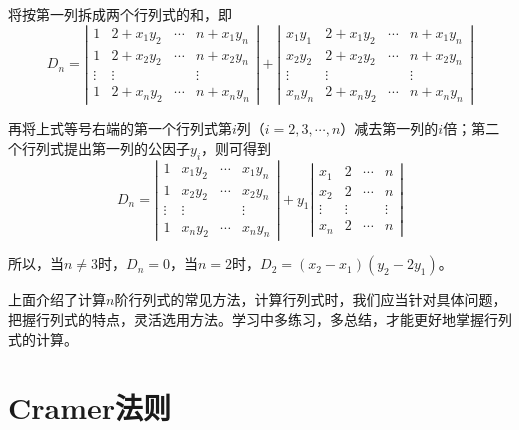 \begin{solution}
    将按第一列拆成两个行列式的和，即
$$D_{n}=\left|\begin{array}{ccccccc}
        1      & 2+x_{1}y_{2} & \cdots & n+x_{1}y_{n} \\
        1      & 2+x_{2}y_{2} & \cdots & n+x_{2}y_{n} \\
        \vdots & \vdots       &        & \vdots       \\
        1      & 2+x_{n}y_{2} & \cdots & n+x_{n}y_{n}
    \end{array}\right|+
    \left|\begin{array}{ccccccc}
        x_{1}y_{1} & 2+x_{1}y_{2} & \cdots & n+x_{1}y_{n} \\
        x_{2}y_{2} & 2+x_{2}y_{2} & \cdots & n+x_{2}y_{n} \\
        \vdots     & \vdots       &        & \vdots       \\
        x_{n}y_{n} & 2+x_{n}y_{2} & \cdots & n+x_{n}y_{n}
    \end{array}\right|
$$

再将上式等号右端的第一个行列式第$i$列（$i=2,3,\cdots,n$）减去第一列的$i$倍；第二个行列式提出第一列的公因子$y_{i}$，则可得到
$$D_{n}=\left|\begin{array}{ccccccc}
        1      & x_{1}y_{2} & \cdots & x_{1}y_{n} \\
        1      & x_{2}y_{2} & \cdots & x_{2}y_{n} \\
        \vdots & \vdots     &        & \vdots     \\
        1      & x_{n}y_{2} & \cdots & x_{n}y_{n}
    \end{array}\right|+y_{1}
    \left|\begin{array}{ccccccc}
        x_{1}  & 2      & \cdots & n      \\
        x_{2}  & 2      & \cdots & n      \\
        \vdots & \vdots &        & \vdots \\
        x_{n}  & 2      & \cdots & n
    \end{array}\right|
$$

所以，当$n\ne 3$时，$D_{n}=0$，当$n=2$时，$D_{2}=(x_{2}-x_{1})(y_{2}-2y_{1})$。
\end{solution}

上面介绍了计算$n$阶行列式的常见方法，计算行列式时，我们应当针对具体问题，把握行列式的特点，灵活选用方法。学习中多练习，多总结，才能更好地掌握行列式的计算。


\section{Cramer法则}

